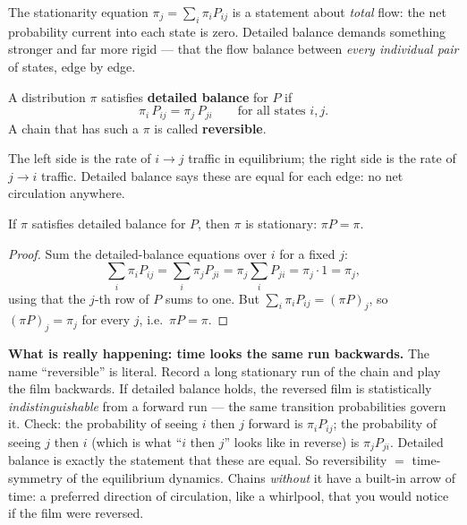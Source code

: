 The stationarity equation $\pi_j = \sum_i \pi_i P_{ij}$ is a statement about
\emph{total} flow: the net probability current into each state is zero. Detailed
balance demands something stronger and far more rigid --- that the flow balance
between \emph{every individual pair} of states, edge by edge.

\begin{definition}
\label{ch24:def-detailed-balance}
A distribution $\pi$ satisfies \textbf{detailed balance} for $P$ if
\[
  \pi_i\, P_{ij} = \pi_j\, P_{ji} \qquad \text{for all states } i,j .
\]
A chain that has such a $\pi$ is called \textbf{reversible}.
\end{definition}

The left side is the rate of $i\to j$ traffic in equilibrium; the right side is
the rate of $j\to i$ traffic. Detailed balance says these are equal for each edge:
no net circulation anywhere.

\begin{theorem}
\label{ch24:thm-db-implies-stationary}
If $\pi$ satisfies detailed balance for $P$, then $\pi$ is stationary: $\pi P = \pi$.
\end{theorem}

\begin{proof}
Sum the detailed-balance equations over $i$ for a fixed $j$:
\[
  \sum_i \pi_i P_{ij} = \sum_i \pi_j P_{ji} = \pi_j \sum_i P_{ji} = \pi_j \cdot 1 = \pi_j ,
\]
using that the $j$-th row of $P$ sums to one. But $\sum_i \pi_i P_{ij} = (\pi P)_j$,
so $(\pi P)_j = \pi_j$ for every $j$, i.e.\ $\pi P = \pi$.
\end{proof}

\begin{happeningbox}
\textbf{What is really happening: time looks the same run backwards.} The name
``reversible'' is literal. Record a long stationary run of the chain and play the
film backwards. If detailed balance holds, the reversed film is statistically
\emph{indistinguishable} from a forward run --- the same transition probabilities
govern it. Check: the probability of seeing $i$ then $j$ forward is
$\pi_i P_{ij}$; the probability of seeing $j$ then $i$ (which is what
``$i$ then $j$'' looks like in reverse) is $\pi_j P_{ji}$. Detailed balance is
exactly the statement that these are equal. So reversibility $=$ time-symmetry of
the equilibrium dynamics. Chains \emph{without} it have a built-in arrow of time:
a preferred direction of circulation, like a whirlpool, that you would notice if
the film were reversed.
\end{happeningbox}

